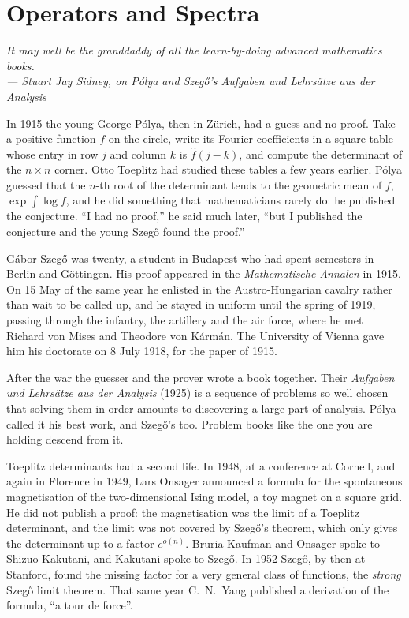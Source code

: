 \chapter{Operators and Spectra}\label{ch:operators}

\begin{center}\itshape
It may well be the granddaddy of all the learn-by-doing advanced mathematics books.\\[2pt]
\upshape--- Stuart Jay Sidney, on Pólya and Szegő's \emph{Aufgaben und Lehrsätze aus der Analysis}
\end{center}

In 1915 the young George Pólya, then in Zürich, had a guess and no proof. Take a positive function $f$ on the circle, write its Fourier coefficients
in a square table whose entry in row $j$ and column $k$ is $\hat f(j-k)$, and compute the determinant of the $n\times n$ corner. Otto Toeplitz had studied
these tables a few years earlier. Pólya guessed that the $n$-th root of the determinant tends to the geometric mean of $f$, $\exp\int\log f$, and he did
something that mathematicians rarely do: he published the conjecture. ``I had no proof,'' he said much later, ``but I published the conjecture and the
young Szegő found the proof.''

Gábor Szegő was twenty, a student in Budapest who had spent semesters in Berlin and Göttingen. His proof appeared in the \emph{Mathematische Annalen}
in 1915. On 15 May of the same year he enlisted in the Austro-Hungarian cavalry rather than wait to be called up, and he stayed in uniform until the
spring of 1919, passing through the infantry, the artillery and the air force, where he met Richard von Mises and Theodore von Kármán. The University of
Vienna gave him his doctorate on 8 July 1918, for the paper of 1915.

After the war the guesser and the prover wrote a book together. Their \emph{Aufgaben und Lehrsätze aus der Analysis} (1925) is a sequence of problems so
well chosen that solving them in order amounts to discovering a large part of analysis. Pólya called it his best work, and Szegő's too. Problem books
like the one you are holding descend from it.

Toeplitz determinants had a second life. In 1948, at a conference at Cornell, and again in Florence in 1949, Lars Onsager announced a formula for the
spontaneous magnetisation of the two-dimensional Ising model, a toy magnet on a square grid. He did not publish a proof: the magnetisation was the limit of
a Toeplitz determinant, and the limit was not covered by Szegő's theorem, which only gives the determinant up to a factor $e^{o(n)}$. Bruria Kaufman
and Onsager spoke to Shizuo Kakutani, and Kakutani spoke to Szegő. In 1952 Szegő, by then at Stanford, found the missing factor for a very general class of
functions, the \emph{strong} Szegő limit theorem. That same year C.~N.~Yang published a derivation of the formula, ``a tour de force''.

